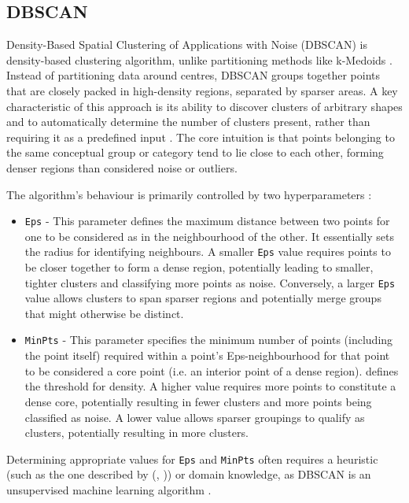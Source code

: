 \documentclass[10pt,oneside]{report}
\renewcommand{\citet}[1]{\citeauthor{#1}, \citeyear{#1}}
\begin{document}
\subsection{DBSCAN}

Density-Based Spatial Clustering of Applications with Noise (DBSCAN) is density-based clustering algorithm, unlike partitioning methods like k-Medoids \cite{ester1996density}. Instead of partitioning data around centres, DBSCAN groups together points that are closely packed in high-density regions, separated by sparser areas. A key characteristic of this approach is its ability to discover clusters of arbitrary shapes and to automatically determine the number of clusters present, rather than requiring it as a predefined input \cite{ester1996density}. The core intuition is that points belonging to the same conceptual group or category tend to lie close to each other, forming denser regions than considered noise or outliers.

The algorithm's behaviour is primarily controlled by two hyperparameters \cite{ester1996density}:
\begin{itemize}
    \item \texttt{Eps} - This parameter defines the maximum distance between two points for one to be considered as in the neighbourhood of the other. It essentially sets the radius for identifying neighbours. A smaller \texttt{Eps} value requires points to be closer together to form a dense region, potentially leading to smaller, tighter clusters and classifying more points as noise. Conversely, a larger \texttt{Eps} value allows clusters to span sparser regions and potentially merge groups that might otherwise be distinct.
    \item \texttt{MinPts} - This parameter specifies the minimum number of points (including the point itself) required within a point's Eps-neighbourhood for that point to be considered a core point (i.e. an interior point of a dense region).  defines the threshold for density. A higher value requires more points to constitute a dense core, potentially resulting in fewer clusters and more points being classified as noise. A lower value allows sparser groupings to qualify as clusters, potentially resulting in more clusters.
\end{itemize}

Determining appropriate values for \texttt{Eps} and \texttt{MinPts} often requires a heuristic (such as the one described by (\citet{ester1996density})) or domain knowledge, as DBSCAN is an unsupervised machine learning algorithm \cite{ester1996density}.
\end{document}
